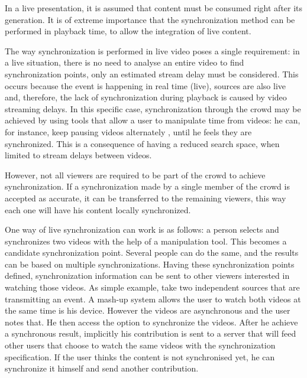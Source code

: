 In a live presentation, it is assumed that content must be consumed right after its generation. It is of extreme importance that the synchronization method can be performed in playback time, to allow the integration of live content.

The way synchronization is performed in live video poses a single requirement: in a live situation, there is no need to analyse an entire video to find synchronization points, only an estimated stream delay must be considered. This occurs because the event is happening in real time (live), sources are also live and, therefore, the lack of synchronization during playback is caused by video streaming delays. In this specific case, synchronization through the crowd may be achieved by using tools that allow a user to manipulate time from videos: he can, for instance, keep pausing videos alternately , until he feels they are synchronized. This is a consequence of having a reduced search space, when limited to stream delays between videos.

However, not all viewers are required to be part of the crowd to achieve synchronization. If a synchronization made by a single member of the crowd is accepted as accurate, it can be transferred to the remaining viewers, this way each one will have his content locally synchronized.

One way of live synchronization can work is as follows: a person selects and synchronizes two videos with the help of a manipulation tool. This becomes a candidate synchronization point. Several people can do the same, and the results can be based on multiple synchronizations. Having these synchronization points defined, synchronization information can be sent to other viewers interested in watching those videos. As simple example, take two independent sources that are transmitting an event. A mash-up system allows the user to watch both videos at the same time is his device. However the videos are asynchronous and the user notes that. He then access the option to synchronize the videos. After he achieve a synchronous result, implicitly his contribution is sent to a server that will feed other users that choose to watch the same videos with the synchronization specification. If the user thinks the content is not synchronised yet, he can synchronize it himself and send another contribution.
